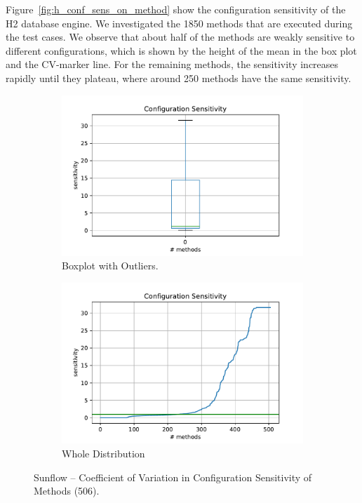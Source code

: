 Figure~\ref{fig:h_conf_sens_on_method} show the configuration sensitivity of the H2 database engine. We investigated the 1850 methods that are executed during the test cases. We observe that about half of the methods are weakly sensitive to different configurations, which is shown by the height of the mean in the box plot and the \ac{CV}-marker line. For the remaining methods, the sensitivity increases rapidly until they plateau, where around 250 methods have the same sensitivity. 

\begin{figure}[h]
	\centering
	\begin{subfigure}{.5\textwidth}
	  \centering
	  \includegraphics[width=.99\linewidth]{images/Sunflow_box_conf_sens_cv_with_outl}
	  \caption{Boxplot with Outliers.}
	  \label{fig:s_conf_sens_on_method:sub1}
	\end{subfigure}%
	\begin{subfigure}{.5\textwidth}
	  \centering
	  \includegraphics[width=.99\linewidth]{images/Sunflow_plt_conf_sens_cv_with_outl}
	  \caption{Whole Distribution}
	  \label{fig:s_conf_sens_on_method:sub2}
	\end{subfigure}
	\caption{Sunflow -- Coefficient of Variation in Configuration Sensitivity of Methods (506).}
	\label{fig:s_conf_sens_on_method}
\end{figure}

